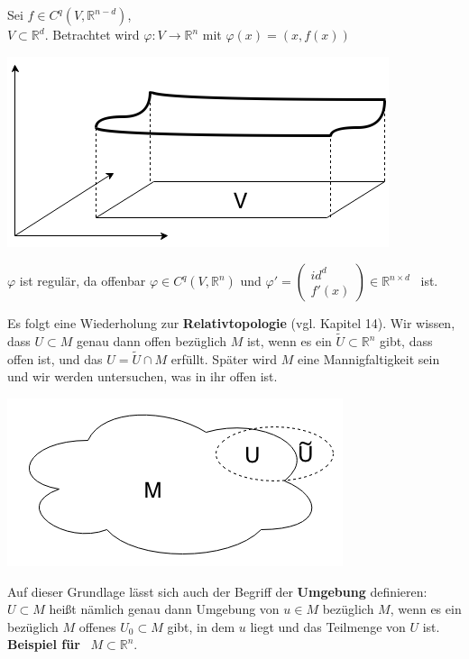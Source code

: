 \begin{beispiel}
Sei $f\in C^q(V,\mathbb{R}^{n-d})$,\\
$V\subset\mathbb{R}^d$. Betrachtet wird $\varphi:V\rightarrow\mathbb{R}^n$ mit $\varphi(x)=(x,f(x))$\\
    \begin{center}
    \includegraphics[scale=0.5]{pictures/MA2_0005}\\
    \end{center}
$\varphi$ ist regulär, da offenbar $\varphi\in C^q(V,\mathbb{R}^n)$ 
und $\varphi'=
    \begin{pmatrix} 
    id^d \\ 
    f'(x)
    \end{pmatrix}     
\in \mathbb{R}^{n \times d}$ \ ist.\\
\linebreak
\end{beispiel}

Es folgt eine Wiederholung zur \textbf{Relativtopologie} (vgl. Kapitel 14). Wir wissen, dass $U\subset M$ genau dann offen bezüglich $M$ ist, wenn es ein $\tilde{U}\subset\mathbb{R}^n$ gibt, dass offen ist, und das $U=\tilde{U}\cap M$ erfüllt. Später wird $M$ eine Mannigfaltigkeit sein und wir werden untersuchen, was in ihr offen ist.\\

\begin{center}
\includegraphics[scale=0.5]{pictures/MA2_0006}\\
\end{center}
Auf dieser Grundlage lässt sich auch der Begriff der \textbf{Umgebung} definieren:\\
$U\subset M$ heißt nämlich genau dann Umgebung von $u\in M$ bezüglich $M$, wenn es ein bezüglich $M$ offenes $U_0\subset M$ gibt, in dem $u$ liegt und das Teilmenge von $U$ ist.\linebreak\linebreak
\newpage
\textbf{\textsf{Beispiel für}} \ $M\subset\mathbb{R}^n$.\\

